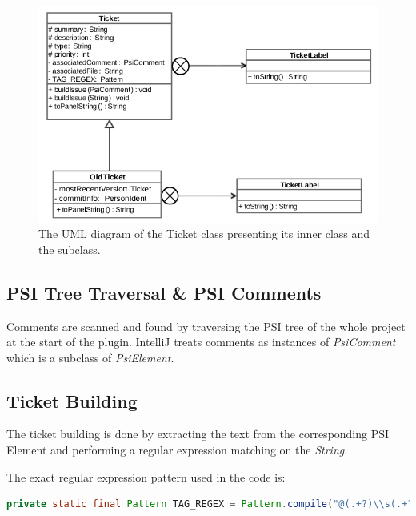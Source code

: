 \documentclass{4thYearProject}
\begin{document}
\begin{figure}[H]
\includegraphics[scale=0.6]{Ticket_UML}
\centering
\caption{The UML diagram of the Ticket class presenting its inner class and the subclass.}\label{ticketuml}
\label{fig:ticketuml}
\end{figure}

\subsection{PSI Tree Traversal \& PSI Comments}

Comments are scanned and found by traversing the PSI tree of the whole project at the start of the plugin. IntelliJ treats comments as instances of \textit{PsiComment} which is a subclass of \textit{PsiElement}.   

\subsection{Ticket Building}

The ticket building is done by extracting the text from the corresponding PSI Element and performing a regular expression matching on the \textit{String}.

The exact regular expression pattern used in the code is:
\begin{lstlisting}[language=Java, basicstyle=\footnotesize\tt,        % the size of the fonts that are used for the code
  frame=single,                    % adds a frame around the code
  language=Java,                 % the language of the code
  keywordstyle=\bf]
 private static final Pattern TAG_REGEX = Pattern.compile("@(.+?)\\s(.+?)\\n");
\end{lstlisting}
\end{document}
